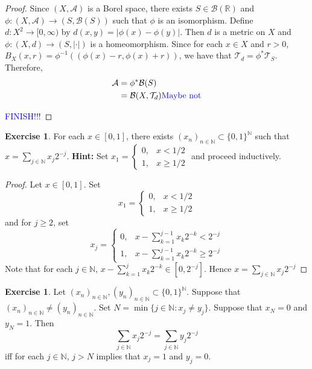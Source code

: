 \documentclass{book}
\theoremstyle{definition}
\newtheorem{ex}[definition]{Exercise}
\newcommand{\N}{\mathbb{N}}
\newcommand{\R}{\mathbb{R}}
\newcommand{\MA}{\mathcal{A}}
\newcommand{\MB}{\mathcal{B}}
\newcommand{\MT}{\mathcal{T}}
\newcommand{\lex}[1]{\label{ex:#1}}
\DeclareMathOperator*{\0}{\mbf{0}}
\DeclareMathOperator*{\1}{\mbf{1}}
\newcommand{\tcb}[1]{\textcolor{blue}{#1}}
\newcommand{\Rg}{[0,\infty)}
\begin{document}
	\begin{proof}
		Since $(X, \MA)$ is a Borel space, there exists $S \in \MB(\R)$ and $\phi: (X, \MA) \rightarrow (S, \MB(S))$ such that $\phi$ is an isomorphism. Define $d: X^2 \rightarrow \Rg$ by $d(x,y) = |\phi(x) - \phi(y)|$. Then $d$ is a metric on $X$ and $\phi: (X, d) \rightarrow (S, |\cdot|)$ is a homeomorphism. Since for each $x \in X$ and $r > 0$, $B_X(x, r) = \phi^{-1}((\phi(x) - r, \phi(x) + r))$, we have that $\MT_d = \phi^*\MT_{S}$. Therefore, 
		\begin{align*}
			\MA 
			& = \phi^* \MB(S) \\
			& = \MB(X, \MT_d)  \text{\tcb{ Maybe not}}
		\end{align*} 
	
		\tcb{FINISH!!!}
	\end{proof}
	
	\begin{ex} \lex{28001} 
		For each $x \in [0, 1]$, there exists $(x_n)_{n \in \N} \subset \{0,1\}^{\N}$ such that $x = \sum\limits_{j \in \N} x_j2^{-j}$.
		\textbf{Hint:} Set $x_1 = 
		\begin{cases}
			0, & x < 1/2 \\
			1, & x \geq 1/2 
		\end{cases}$
		and proceed inductively. 
	\end{ex}

	\begin{proof}
		Let $x \in [0,1]$. Set 
		$$x_1 = 
		\begin{cases}
			0, & x < 1/2 \\
			1, & x \geq 1/2 
		\end{cases}$$
	and for $j \geq 2$, set 
	$$x_j = \begin{cases}
		0, & x - \sum\limits_{k = 1}^{j-1}x_k2^{-k} < 2^{-j} \\
		1, & x - \sum\limits_{k = 1}^{j-1}x_k2^{-k} \geq 2^{-j} 
	\end{cases}$$
	Note that for each $j \in \N$, $x - \sum\limits_{k = 1}^{j}x_k2^{-k} \in [0, 2^{-j}]$. Hence $x = \sum\limits_{j \in \N} x_j2^{-j}$
	\end{proof}

	\begin{ex} \lex{28002} 
		Let $(x_n)_{n \in \N}, (y_n)_{n \in \N} \subset \{0,1\}^{\N}$. Suppose that $(x_n)_{n \in \N} \neq (y_n)_{n \in \N}$. Set $N = \min\{j \in \N: x_j \neq y_j\}$. Suppose that $x_N = 0$ and $y_N = 1$. Then
		$$\sum\limits_{j \in \N} x_j 2^{-j} = \sum\limits_{j \in \N} y_j 2^{-j}$$ 
		iff for each $j \in \N$, $j > N$ implies that $x_j = 1$ and $y_j = 0$. 
	\end{ex}
\end{document}
